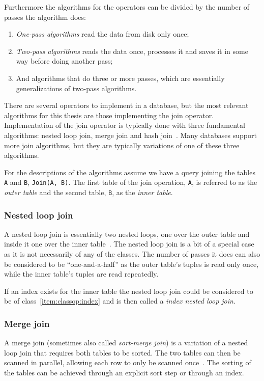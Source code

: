 Furthermore the algorithms for the operators can be divided by the number of passes the algorithm does:
\begin{enumerate}
    \item \textit{One-pass algorithms} read the data from disk only once;
    \item \textit{Two-pass algorithms} reads the data once, processes it and saves it in some way before doing another pass;
    \item And algorithms that do three or more passes, which are essentially generalizations of two-pass algorithms.
\end{enumerate}

There are several operators to implement in a database, but the most relevant
algorithms for this thesis are those implementing the join operator.
Implementation of the join operator is typically done with three fundamental
algorithms: nested loop join, merge join and hash join~\cite{postgresql_pd9p}.
Many databases support more join algorithms, but they are typically variations
of one of these three algorithms.

For the descriptions of the algorithms assume we have a query joining the tables
\texttt{A} and \texttt{B}, \texttt{Join(A, B)}. The first table of the join
operation, \texttt{A}, is referred to as the \textit{outer table} and the second
table, \texttt{B}, as the \textit{inner table}.

\subsubsection{Nested loop join}\label{sec:nestedloopjoin}
A nested loop join is essentially two nested loops, one over the outer table and
inside it one over the inner table~\cite[p. 718-722]{garcia-molina_2002_database_dstcb}. The nested loop join is a bit of a
special case as it is not necessarily of any of the classes. The number of
passes it does can also be considered to be ``one-and-a-half'' as the outer
table's tuples is read only once, while the inner table's tuples are read
repeatedly.

If an index exists for the inner table the nested loop join could be considered
to be of class~\ref{item:classop:index} and is then called a \textit{index
  nested loop join}.

\subsubsection{Merge join}
A merge join (sometimes also called \textit{sort-merge join}) is a variation of
a nested loop join that requires both tables to be sorted. The two tables can
then be scanned in parallel, allowing each row to only be scanned
once~\cite[p. 723-730]{garcia-molina_2002_database_dstcb}. The sorting of the
tables can be achieved through an explicit sort step or through an index.

